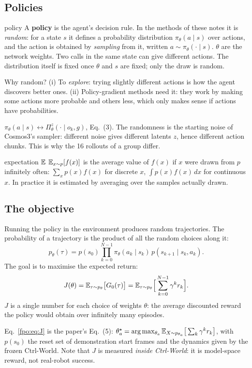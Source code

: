 \subsection{Policies}
\begin{newc}{policy}
A \textbf{policy} is the agent's decision rule. In the methods of these notes it is \emph{random}: for a state $s$ it defines a probability distribution $\pi_\theta(a\mid s)$ over actions, and the action is obtained by \emph{sampling} from it, written $a\sim\pi_\theta(\cdot\mid s)$. $\theta$ are the network weights. Two calls in the same state can give different actions. The distribution itself is fixed once $\theta$ and $s$ are fixed; only the draw is random.
\end{newc}
Why random? (i) To \emph{explore}: trying slightly different actions is how the agent discovers better ones. (ii) Policy-gradient methods need it: they work by making some actions more probable and others less, which only makes sense if actions have probabilities.

\begin{paperlink}
$\pi_\theta(a\mid s)\leftrightarrow\Pi^z_\theta(\cdot\mid o_k,g)$, Eq.~(3). The randomness is the starting noise of Cosmos3's sampler: different noise gives different latents $z$, hence different action chunks. This is why the 16 rollouts of a group differ.
\end{paperlink}

\begin{newc}{expectation $\mathbb{E}$}
$\mathbb{E}_{x\sim p}[f(x)]$ is the average value of $f(x)$ if $x$ were drawn from $p$ infinitely often: $\sum_xp(x)f(x)$ for discrete $x$, $\int p(x)f(x)\,dx$ for continuous $x$. In practice it is estimated by averaging over the samples actually drawn.
\end{newc}

\subsection{The objective}
Running the policy in the environment produces random trajectories. The probability of a trajectory is the product of all the random choices along it:
\begin{equation}
p_\theta(\tau)=p(s_0)\prod_{k=0}^{N-1}\pi_\theta(a_k\mid s_k)\,p(s_{k+1}\mid s_k,a_k).
\label{fpo:eq:ptau}
\end{equation}
The goal is to maximise the expected return:
\begin{equation}
J(\theta)=\mathbb{E}_{\tau\sim p_\theta}\big[G_0(\tau)\big]=\mathbb{E}_{\tau\sim p_\theta}\Big[\sum_{k=0}^{N-1}\gamma^kr_k\Big].
\label{fpo:eq:J}
\end{equation}
$J$ is a single number for each choice of weights $\theta$: the average discounted reward the policy would obtain over infinitely many episodes.
\begin{paperlink}
Eq.~\eqref{fpo:eq:J} is the paper's Eq.~(5): $\theta_a^\star=\arg\max_{\theta_a}\mathbb{E}_{X\sim p_{\theta_a}}\big[\sum_k\gamma^kr_k\big]$, with $p(s_0)$ the reset set of demonstration start frames and the dynamics given by the frozen Ctrl-World. Note that $J$ is measured \emph{inside Ctrl-World}: it is model-space reward, not real-robot success.
\end{paperlink}

